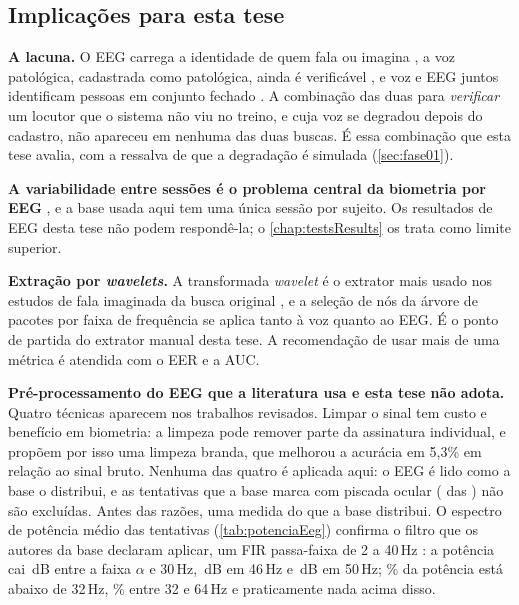 		\subsection{Implicações para esta tese}

			\par \textbf{A lacuna.} O \ac{EEG} carrega a identidade de quem fala ou imagina \cite{brigham2010subject,MOCTEZUMA2019201,derakhshesh2025cueless}, a voz patológica, cadastrada como patológica, ainda é verificável \cite{tayebiarasteh2023effect}, e voz e \ac{EEG} juntos identificam pessoas em conjunto fechado \cite{morenorodriguez2021biomex}. A combinação das duas para \emph{verificar} um locutor que o sistema não viu no treino, e cuja voz se degradou depois do cadastro, não apareceu em nenhuma das duas buscas. É essa combinação que esta tese avalia, com a ressalva de que a degradação é simulada (\autoref{sec:fase01}).

			\par \textbf{A variabilidade entre sessões é o problema central da biometria por \ac{EEG}} \cite{albaiati2025deep,deataide2026brain,fallahi2025advancing}, e a base usada aqui tem uma única sessão por sujeito. Os resultados de \ac{EEG} desta tese não podem respondê-la; o \autoref{chap:testsResults} os trata como limite superior.

			\par \textbf{Extração por \textit{wavelets}.} A transformada \textit{wavelet} é o extrator mais usado nos estudos de fala imaginada da busca original \cite{ShahUzair2022TRoA}, e a seleção de nós da árvore de pacotes por faixa de frequência \cite{math11194205} se aplica tanto à voz quanto ao \ac{EEG}. É o ponto de partida do extrator manual desta tese. A recomendação de usar mais de uma métrica \cite{ShahUzair2022TRoA} é atendida com o \ac{EER} e a \ac{AUC}.

			\par \textbf{Pré-processamento do \ac{EEG} que a literatura usa e esta tese não adota.} Quatro técnicas aparecem nos trabalhos revisados. Limpar o sinal tem custo e benefício em biometria: a limpeza pode remover parte da assinatura individual, e \cite{usman2026balancing} propõem por isso uma limpeza branda, que melhorou a acurácia em 5,3\% em relação ao sinal bruto. Nenhuma das quatro é aplicada aqui: o \ac{EEG} é lido como a base o distribui, e as tentativas que a base marca com piscada ocular ( das ) não são excluídas. Antes das razões, uma medida do que a base distribui. O espectro de potência médio das  tentativas (\autoref{tab:potenciaEeg}) confirma o filtro que os autores da base declaram aplicar, um FIR passa-faixa de 2 a 40\,Hz \cite{10.1117/12.2255697}: a potência cai \,dB entre a faixa $\alpha$ e 30\,Hz, \,dB em 46\,Hz e \,dB em 50\,Hz; \% da potência está abaixo de 32\,Hz, \% entre 32 e 64\,Hz e praticamente nada acima disso.

